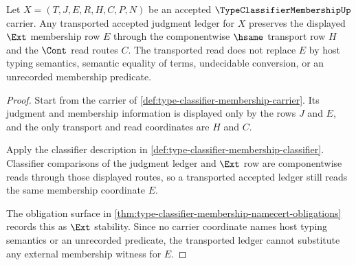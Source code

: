 \begin{theorem}
\label{thm:type-classifier-membership-ext-membership-stability}
Let $X=(T,J,E,R,H,C,P,N)$ be an accepted $\TypeClassifierMembershipUp$ carrier. Any transported accepted judgment ledger for $X$ preserves the displayed $\Ext$ membership row $E$ through the componentwise $\hsame$ transport row $H$ and the $\Cont$ read routes $C$. The transported read does not replace $E$ by host typing semantics, semantic equality of terms, undecidable conversion, or an unrecorded membership predicate.
\end{theorem}
\begin{proof}
Start from the carrier of \autoref{def:type-classifier-membership-carrier}. Its judgment and membership information is displayed only by the rows $J$ and $E$, and the only transport and read coordinates are $H$ and $C$.

Apply the classifier description in \autoref{def:type-classifier-membership-classifier}. Classifier comparisons of the judgment ledger and $\Ext$ row are componentwise reads through those displayed routes, so a transported accepted ledger still reads the same membership coordinate $E$.

The obligation surface in \autoref{thm:type-classifier-membership-namecert-obligations} records this as $\Ext$ stability. Since no carrier coordinate names host typing semantics or an unrecorded predicate, the transported ledger cannot substitute any external membership witness for $E$.
\end{proof}

